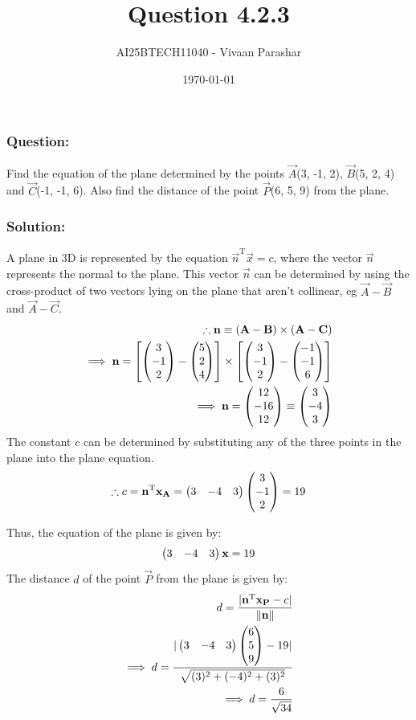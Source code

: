 \documentclass{beamer}
\title{Question 4.2.3}
\author{AI25BTECH11040 - Vivaan Parashar}
\date{\today}
\begin{document}
\frame{\titlepage}

\begin{frame}
    \frametitle{Question: }
    Find the equation of the plane determined by the points $\vec{A}$(3, -1, 2), $\vec{B}$(5, 2, 4) and $\vec{C}$(-1, -1, 6). Also find the distance of the point $\vec{P}$(6, 5, 9) from the plane.
\end{frame}

\begin{frame}
    \frametitle{Solution: }
    A plane in 3D is represented by the equation $\vec{n}^\mathrm{T}\vec{x} = c$, where the vector $\vec{n}$ represents the normal to the plane.
    This vector $\vec{n}$ can be determined by using the cross-product of two vectors lying on the plane that aren't collinear, eg $\vec{A} - \vec{B}$ and $\vec{A} - \vec{C}$.
    \begin{align}
        \therefore \mathbf{n} \equiv (\mathbf{A}-\mathbf{B})\times(\mathbf{A}-\mathbf{C}) \\
        \implies \mathbf{n} = \left[\begin{pmatrix}3                                  \\ -1 \\ 2\end{pmatrix} - \begin{pmatrix}5 \\ 2 \\ 4\end{pmatrix}\right] \times \left[\begin{pmatrix}3 \\ -1 \\ 2\end{pmatrix} - \begin{pmatrix}-1 \\ -1 \\ 6\end{pmatrix}\right]\\
        \implies \mathbf{n} = \begin{pmatrix}12                                       \\ -16 \\ 12\end{pmatrix} \equiv \begin{pmatrix}3 \\ -4 \\ 3\end{pmatrix}
    \end{align}
    The constant $c$ can be determined by substituting any of the three points in the plane into the plane equation.
    \begin{align}
        \therefore c = \mathbf{n}^\mathrm{T}\mathbf{x_A} = \begin{pmatrix}3 & -4 & 3\end{pmatrix}\begin{pmatrix}3 \\ -1 \\ 2\end{pmatrix} = 19
    \end{align}
\end{frame}
\begin{frame}
    Thus, the equation of the plane is given by:
    \begin{align}
        \begin{pmatrix}3 & -4 & 3\end{pmatrix}\mathbf{x} = 19
    \end{align}
    The distance $d$ of the point $\vec{P}$ from the plane is given by:
    \begin{align}
        d = \frac{|\mathbf{n}^\mathrm{T}\mathbf{x_P} - c|}{\|\mathbf{n}\|} \\
        \implies d = \frac{|\begin{pmatrix}3 & -4 & 3\end{pmatrix}\begin{pmatrix}6            \\ 5 \\ 9\end{pmatrix} - 19|}{\sqrt{(3)^2 + (-4)^2 + (3)^2}}\\
        \implies d = \frac{6}{\sqrt{34}}
    \end{align}
\end{frame}
\end{document}
